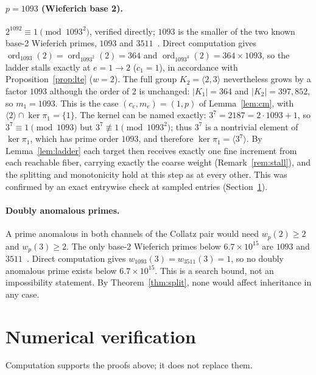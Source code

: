 \documentclass[11pt]{article}
\theoremstyle{definition}
\theoremstyle{remark}
\newcommand{\ord}{\operatorname{ord}}
\begin{document}
\paragraph{$p=1093$ (Wieferich base 2).}
$2^{1092}\equiv1\pmod{1093^2}$, verified directly; $1093$ is the smaller of the two known base-2 Wieferich primes, $1093$ and $3511$~\cite{Wieferich1909,DoraisKlyve2011}. Direct computation gives $\ord_{1093}(2)=\ord_{1093^2}(2)=364$ and $\ord_{1093^3}(2)=364\times1093$, so the ladder stalls exactly at $e=1\to2$ ($c_1=1$), in accordance with Proposition~\ref{prop:lte} ($w=2$). The full group $K_2=\langle 2,3\rangle$ nevertheless grows by a factor $1093$ although the order of $2$ is unchanged: $|K_1|=364$ and $|K_2|=397{,}852$, so $m_1=1093$. This is the case $(c_e,m_e)=(1,p)$ of Lemma~\ref{lem:cm}, with $\langle 2\rangle\cap\ker\pi_1=\{1\}$. The kernel can be named exactly: $3^7=2187=2\cdot1093+1$, so $3^7\equiv1\pmod{1093}$ but $3^7\not\equiv1\pmod{1093^2}$; thus $3^7$ is a nontrivial element of $\ker\pi_1$, which has prime order $1093$, and therefore $\ker\pi_1=\langle 3^7\rangle$. By Lemma~\ref{lem:ladder} each target then receives exactly one fine increment from each reachable fiber, carrying exactly the coarse weight (Remark~\ref{rem:stall}), and the splitting and monotonicity hold at this step as at every other. This was confirmed by an exact entrywise check at sampled entries (Section~\ref{sec:numerics}).

\paragraph{Doubly anomalous primes.}
A prime anomalous in both channels of the Collatz pair would need $w_p(2)\ge2$ and $w_p(3)\ge2$. The only base-2 Wieferich primes below $6.7\times10^{15}$ are $1093$ and $3511$~\cite{DoraisKlyve2011}. Direct computation gives $w_{1093}(3)=w_{3511}(3)=1$, so no doubly anomalous prime exists below $6.7\times10^{15}$. This is a search bound, not an impossibility statement. By Theorem~\ref{thm:split}, none would affect inheritance in any case.

\section{Numerical verification}\label{sec:numerics}

Computation supports the proofs above; it does not replace them.
\end{document}
